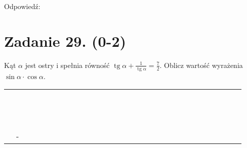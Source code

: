 \documentclass[10pt]{article}
\begin{document}
Odpowiedź:

\section*{Zadanie 29. (0-2)}
Kąt \(\alpha\) jest ostry i spełnia równość \(\operatorname{tg} \alpha+\frac{1}{\operatorname{tg} \alpha}=\frac{7}{2}\). Oblicz wartość wyrażenia \(\sin \alpha \cdot \cos \alpha\).

\begin{center}
\begin{tabular}{|c|c|c|c|c|c|c|c|c|c|c|c|c|c|c|c|c|c|c|c|c|c|c|c|c|c|c|c|c|}
\hline
 &  &  &  &  &  &  &  &  &  &  &  &  &  &  &  &  &  &  &  &  &  &  &  &  &  &  &  &  \\
\hline
 &  &  &  &  &  &  &  &  &  &  &  &  &  &  &  &  &  &  &  &  &  &  &  &  &  &  &  &  \\
\hline
 &  &  &  &  &  &  &  &  &  &  &  &  &  &  &  &  &  &  &  &  &  &  &  &  &  &  &  &  \\
\hline
 &  &  &  &  &  &  &  &  &  &  &  &  &  &  &  &  &  &  &  &  &  &  &  &  &  &  &  &  \\
\hline
 &  &  &  &  &  &  &  &  &  &  &  &  &  &  &  &  &  &  &  &  &  &  &  &  &  &  &  &  \\
\hline
 &  &  &  &  &  &  &  &  &  &  &  &  &  &  &  &  &  &  &  &  &  &  &  &  &  &  &  &  \\
\hline
 &  &  &  &  &  &  &  &  &  &  &  &  &  &  &  &  &  &  &  &  &  &  &  &  &  &  &  &  \\
\hline
 &  &  &  &  &  &  &  &  &  &  &  &  &  &  &  &  &  &  &  &  &  &  &  &  &  &  &  &  \\
\hline
 &  &  &  &  &  &  &  &  &  &  &  &  &  &  &  &  &  &  &  &  &  &  &  &  &  &  &  &  \\
\hline
 &  &  &  &  &  &  &  &  &  &  &  &  &  &  &  &  &  &  &  &  &  &  &  &  &  &  &  &  \\
\hline
 &  &  &  &  &  &  &  &  &  &  &  &  &  &  &  &  &  &  &  &  &  &  &  &  &  &  &  &  \\
\hline
 &  &  &  &  &  &  &  &  &  &  &  &  &  &  &  &  &  &  &  &  &  &  &  &  &  &  &  &  \\
\hline
 &  &  &  &  &  &  &  &  &  &  &  &  &  &  &  &  &  &  &  &  &  &  &  &  &  &  &  &  \\
\hline
 &  &  &  &  &  &  &  &  &  &  &  &  &  &  &  &  &  &  &  &  &  &  &  &  &  &  &  &  \\
\hline
 & - &  &  &  &  &  &  &  &  &  &  &  &  &  &  &  &  &  &  &  &  &  &  &  &  &  &  &  \\

\end{tabular}
\end{center}
\end{document}
